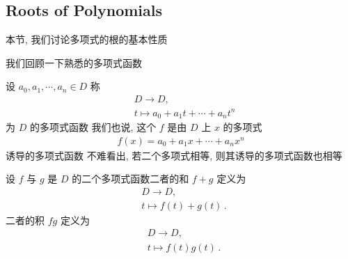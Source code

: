 \subsection*{Roots of Polynomials}

本节, 我们讨论多项式的根的基本性质\period

我们回顾一下熟悉的多项式函数\period

\begin{definition}
    设 $a_0, a_1, \cdots, a_n \in D$ 称
    \begin{align*}
         & D \to D, \tag*{$f \colon$}               \\
         & t \mapsto a_0 + a_1 t + \cdots + a_n t^n
    \end{align*}
    为 $D$ 的多项式函数 \period 我们也说, 这个 $f$ 是由 $D$ 上 $x$ 的多项式
    \begin{align*}
        f(x) = a_0 + a_1 x + \cdots + a_n x^n
    \end{align*}
    诱导的多项式函数 \period 不难看出, 若二个多项式相等, 则其诱导的多项式函数也相等\period
\end{definition}

\begin{definition}
    设 $f$ 与 $g$ 是 $D$ 的二个多项式函数\period 二者的和 $f+g$ 定义为
    \begin{align*}
         & D \to D, \tag*{$f+g \colon$}  \\
         & t \mapsto f(t) + g(t) \period
    \end{align*}
    二者的积 $fg$ 定义为
    \begin{align*}
         & D \to D, \tag*{$fg \colon$} \\
         & t \mapsto f(t) g(t) \period
    \end{align*}
\end{definition}

